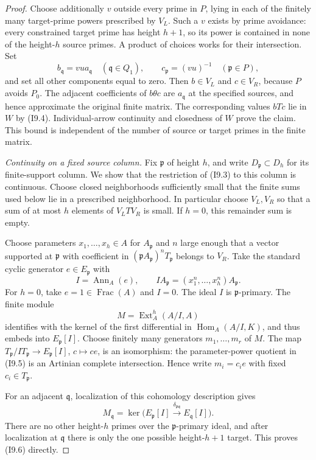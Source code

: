 \begin{proof}
Choose additionally $v$ outside every prime in $P$, lying in each
of the finitely many target-prime powers prescribed by $V_L$.
Such a $v$ exists by prime avoidance: every constrained target
prime has height $h+1$, so its power is contained in none of the
height-$h$ source primes. A product of choices works for their
intersection. Set
\[
 b_{\mathfrak q}=vu a_{\mathfrak q}\quad(\mathfrak q\in Q_1),
 \qquad c_{\mathfrak p}=(vu)^{-1}\quad(\mathfrak p\in P),
\]
and set all other components equal to zero. Then $b\in V_L$ and
$c\in V_R$, because $P$ avoids $P_0$. The adjacent coefficients
of $b\theta c$ are $a_{\mathfrak q}$ at the specified sources,
and hence approximate the original finite matrix. The corresponding
values $bTc$ lie in $W$ by (I9.4). Individual-arrow continuity and
closedness of $W$ prove the claim. This bound is independent of the
number of source or target primes in the finite matrix.

\emph{Continuity on a fixed source column.}
Fix $\mathfrak p$ of height $h$, and write
$D_{\mathfrak p}\subset D_h$ for its finite-support column.
We show that the restriction of (I9.3) to this column is continuous.
Choose closed neighborhoods sufficiently small that the finite sums
used below lie in a prescribed neighborhood. In particular choose
$V_L,V_R$ so that a sum of at most $h$ elements of $V_LTV_R$ is
small. If $h=0$, this remainder sum is empty.

Choose parameters $x_1,\ldots,x_h\in A$ for
$A_{\mathfrak p}$ and $n$ large enough that a vector supported
at $\mathfrak p$ with coefficient in
$(\mathfrak pA_{\mathfrak p})^nT_{\mathfrak p}$ belongs to $V_R$.
Take the standard cyclic generator $e\in E_{\mathfrak p}$ with
\[
 I=\operatorname{Ann}_A(e),\qquad
 I A_{\mathfrak p}=(x_1^n,\ldots,x_h^n)A_{\mathfrak p}.
                                                        \tag{I9.5}
\]
For $h=0$, take $e=1\in\operatorname{Frac}(A)$ and $I=0$.
The ideal $I$ is $\mathfrak p$-primary. The finite module
\[
                         M=\operatorname{Ext}_A^h(A/I,A)
\]
identifies with the kernel of the first differential in
$\operatorname{Hom}_A(A/I,K)$, and thus embeds into
$E_{\mathfrak p}[I]$. Choose finitely many generators
$m_1,\ldots,m_r$ of $M$. The map
$T_{\mathfrak p}/IT_{\mathfrak p}\to E_{\mathfrak p}[I]$,
$c\mapsto ce$, is an isomorphism: the parameter-power quotient
in (I9.5) is an Artinian complete intersection. Hence write
$m_i=c_i e$ with fixed $c_i\in T_{\mathfrak p}$.

For an adjacent $\mathfrak q$, localization of this cohomology
description gives
\[
 M_{\mathfrak q}
   =\ker\bigl(E_{\mathfrak p}[I]
                \xrightarrow{\delta_{\mathfrak p\mathfrak q}}
                         E_{\mathfrak q}[I]\bigr).        \tag{I9.6}
\]
There are no other height-$h$ primes over the $\mathfrak p$-primary
ideal, and after localization at $\mathfrak q$ there is only the
one possible height-$h+1$ target. This proves (I9.6) directly.


\end{proof}
